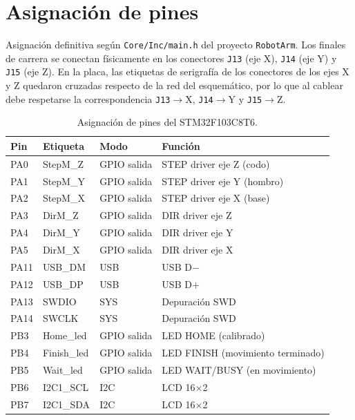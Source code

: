 \section{Asignación de pines}\label{anx:pinout}
Asignación definitiva según \texttt{Core/Inc/main.h} del proyecto \texttt{RobotArm}. Los finales
de carrera se conectan físicamente en los conectores \texttt{J13} (eje X), \texttt{J14} (eje Y) y
\texttt{J15} (eje Z). En la placa, las etiquetas de serigrafía de los conectores de los ejes X y
Z quedaron cruzadas respecto de la red del esquemático, por lo que al cablear debe respetarse la
correspondencia \texttt{J13}$\rightarrow$X, \texttt{J14}$\rightarrow$Y y \texttt{J15}$\rightarrow$Z.

\begin{table}[H]
\centering\small
\caption{Asignación de pines del STM32F103C8T6.}\label{tab:pinout}
\begin{tabular}{@{}llll@{}}
\toprule
\textbf{Pin} & \textbf{Etiqueta} & \textbf{Modo} & \textbf{Función}\\
\midrule
PA0  & StepM\_Z   & GPIO salida & STEP driver eje Z (codo)\\
PA1  & StepM\_Y   & GPIO salida & STEP driver eje Y (hombro)\\
PA2  & StepM\_X   & GPIO salida & STEP driver eje X (base)\\
PA3  & DirM\_Z    & GPIO salida & DIR driver eje Z\\
PA4  & DirM\_Y    & GPIO salida & DIR driver eje Y\\
PA5  & DirM\_X    & GPIO salida & DIR driver eje X\\
PA11 & USB\_DM    & USB         & USB D$-$\\
PA12 & USB\_DP    & USB         & USB D$+$\\
PA13 & SWDIO      & SYS         & Depuración SWD\\
PA14 & SWCLK      & SYS         & Depuración SWD\\
PB3  & Home\_led  & GPIO salida & LED HOME (calibrado)\\
PB4  & Finish\_led& GPIO salida & LED FINISH (movimiento terminado)\\
PB5  & Wait\_led  & GPIO salida & LED WAIT/BUSY (en movimiento)\\
PB6  & I2C1\_SCL  & I2C         & LCD 16$\times$2\\
PB7  & I2C1\_SDA  & I2C         & LCD 16$\times$2\\

\end{tabular}
\end{table}
